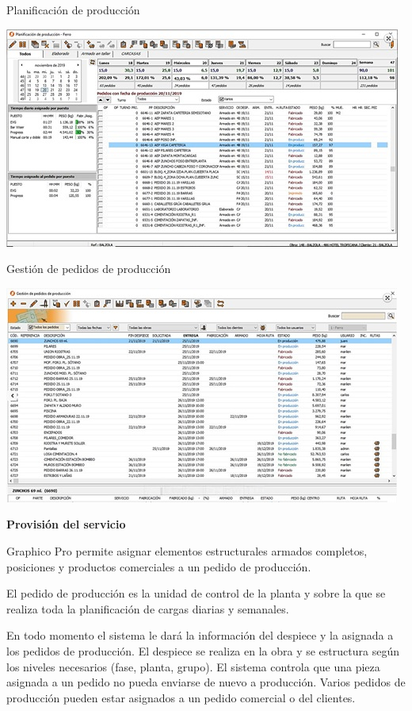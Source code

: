 \documentclass[10pt,a4paper]{article}
\begin{document}
\begin{enumerate}
\begin{center}
Planificación de producción
\end{center}

\includegraphics[scale=1]{GRAPHICO PRO - Planificacion de produccion.JPG}

\begin{center}
Gestión de pedidos de producción
\end{center}

\includegraphics[scale=1]{GRAPHICO PRO - Gestion de pedidos.JPG}

\textbf{Provisión del servicio}

Graphico Pro permite asignar elementos estructurales armados completos, posiciones y productos comerciales a un pedido de producción.

El pedido de producción es la unidad de control de la planta y sobre la que se realiza toda la planificación de cargas diarias y semanales.

En todo momento el sistema le dará la información del despiece y la asignada a los pedidos de producción. El despiece se realiza en la obra y se estructura según los niveles necesarios (fase, planta, grupo). El sistema controla que una pieza asignada a un pedido no pueda enviarse de nuevo a producción. Varios pedidos de producción pueden estar asignados a un pedido comercial o del clientes.


\end{enumerate}
\end{document}
